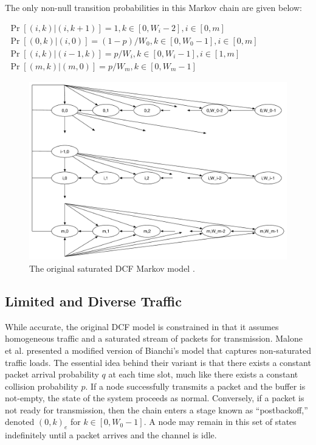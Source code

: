 \documentclass[conference]{IEEEtran}
\begin{document}
The only non-null transition probabilities in this Markov chain are given below:

\vspace{-1em}
\begin{center}
\begin{math}
\begin{array}{lll}
\Pr[(i,k) | (i, k + 1)] = 1, k \in [0, W_i - 2], i \in [0,m] \\
\Pr[(0,k) | (i, 0)] = (1-p)/W_0, k \in [0, W_0 - 1], i \in [0,m] \\
\Pr[(i,k) | (i-1, k)] = p/W_i, k \in [0, W_i - 1], i \in [1,m] \\
\Pr[(m,k) | (m,0)] = p/W_m, k \in [0, W_m - 1] 
\end{array}
\end{math}
\end{center}
\vspace{-1em}

\begin{figure}
\begin{center}
\includegraphics[scale=0.28]{../../sketches/dcf_model.pdf}
\caption{The original saturated DCF Markov model \cite{dcf}.}
\label{fig:dcf_model}
\end{center}
\end{figure}

\subsection{Limited and Diverse Traffic} \label{sec:nonsaturated}
While accurate, the original DCF model is constrained in that it assumes homogeneous traffic and a saturated stream of packets for transmission. Malone et al. \cite{dcf-nonsaturated} presented a modified version of Bianchi's model that captures non-saturated traffic loads. The essential idea behind their variant is that there exists a constant packet arrival probability $q$ at each time slot, much like there exists a constant collision probability $p$. If a node successfully transmits a packet and the buffer is not-empty, the state of the system proceeds as normal. Conversely, if a packet is not ready for transmission, then the chain enters a stage known as ``postbackoff,'' denoted $(0,k)_e$ for $k \in [0, W_0-1]$. A node may remain in this set of states indefinitely until a packet arrives and the channel is idle.
\end{document}
